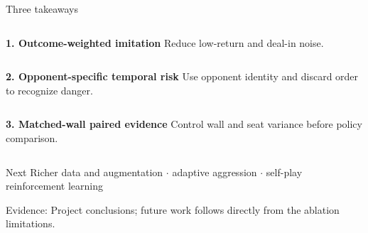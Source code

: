 \documentclass[aspectratio=169,10pt]{beamer}
\newif\ifnobackup
\newcommand{\source}[1]{%
  \vfill
  \ifnobackup\else
    {\fontsize{6.8}{8}\selectfont\color{Muted}Evidence: #1\par}
  \fi
}
\begin{document}
\begin{frame}{Three takeaways}
  \vspace{0.14cm}
  \begin{columns}[T,onlytextwidth]
    \vspace{0pt}
      {\fontsize{12.5}{15}\selectfont\bfseries\color{Navy}1. Outcome-weighted imitation}
    \vspace{0pt}
      Reduce low-return and deal-in noise.
  \end{columns}

  \vspace{0.28cm}
  \begin{columns}[T,onlytextwidth]
    \vspace{0pt}
      {\fontsize{12.5}{15}\selectfont\bfseries\color{TealDark}2. Opponent-specific temporal risk}
    \vspace{0pt}
      Use opponent identity and discard order to recognize danger.
  \end{columns}

  \vspace{0.28cm}
  \begin{columns}[T,onlytextwidth]
    \vspace{0pt}
      {\fontsize{12.5}{15}\selectfont\bfseries\color{Navy}3. Matched-wall paired evidence}
    \vspace{0pt}
      Control wall and seat variance before policy comparison.
  \end{columns}

  \vspace{0.36cm}
  \begin{exampleblock}{Next}
    Richer data and augmentation $\cdot$ adaptive aggression $\cdot$ self-play reinforcement learning
  \end{exampleblock}
  \source{Project conclusions; future work follows directly from the ablation limitations.}
\end{frame}
\end{document}
